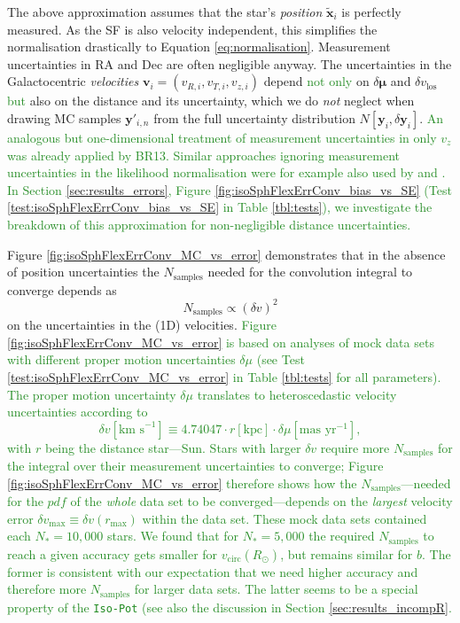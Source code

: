 \documentclass[iop,revtex4]{emulateapj}
\newcommand{\vect}[1]{\boldsymbol{#1}}
\newcommand{\pdf}{\ensuremath{pdf}}
\newcommand{\NEW}[1]{\textcolor{ForestGreen}{#1}}
\newcommand{\OLD}[1]{}
\begin{document}
The above approximation \OLD{also} assumes that the star's \emph{position} $\tilde{\vect{x}}_i$ is perfectly measured. As the SF is also velocity independent, this simplifies the normalisation drastically to Equation \eqref{eq:normalisation}. Measurement uncertainties in $\mathrm{RA}$ and $\mathrm{Dec}$ are often negligible anyway. The uncertainties in the Galactocentric \emph{velocities} $\vect{v}_i = (v_{R,i},v_{T,i},v_{z,i})$ depend \OLD{besides}\NEW{not only} on $\delta \vect{\mu}$ and $\delta v_\text{los}$ \NEW{but} also on the distance and its uncertainty, which we do \emph{not} neglect when drawing MC samples $\vect{y}'_{i,n}$ from the full uncertainty distribution $N[\vect{y}_i,\delta \vect{y}_i]$. \NEW{ An analogous but one-dimensional treatment of measurement uncertainties in only $v_z$ was already applied by BR13. Similar approaches ignoring measurement uncertainties in the likelihood normalisation were for example also used by \citet{2013MNRAS.433.1411M} and \citet{2016arXiv160309332D}. In Section \ref{sec:results_errors}, Figure \ref{fig:isoSphFlexErrConv_bias_vs_SE} (Test \ref{test:isoSphFlexErrConv_bias_vs_SE} in Table \ref{tbl:tests}), we investigate the breakdown of this approximation for non-negligible distance uncertainties.}

Figure \ref{fig:isoSphFlexErrConv_MC_vs_error} demonstrates that in the absence of position uncertainties the $N_\text{samples}$ needed for the convolution integral to converge depends as
\begin{equation*}
N_\text{samples} \propto \left( \delta v \right)^2
\end{equation*}
on the uncertainties in the (1D) velocities. 
\NEW{Figure \ref{fig:isoSphFlexErrConv_MC_vs_error} is based on analyses of mock data sets with different proper motion uncertainties $\delta \mu$ (see Test \ref{test:isoSphFlexErrConv_MC_vs_error} in Table \ref{tbl:tests} for all parameters). The proper motion uncertainty $\delta \mu$ translates to heteroscedastic velocity uncertainties according to 
\begin{equation*}
\delta v [\text{km s}^{-1}] \equiv 4.74047 \cdot r[\text{kpc}] \cdot \delta \mu [\text{mas yr}^{-1}],
\end{equation*}
with $r$ being the distance star---Sun. Stars with larger $\delta v$ require more $N_\text{samples}$ for the integral over their measurement uncertainties to converge; Figure  \ref{fig:isoSphFlexErrConv_MC_vs_error} therefore shows how the $N_\text{samples}$---needed for the \pdf{} of the \emph{whole} data set to be converged---depends on the \emph{largest} velocity error $\delta v_\text{max} \equiv \delta v(r_\text{max})$ within the data set.}
\NEW{These mock data sets contained each $N_{*}=10,000$ stars. We found that for $N_{*}=5,000$ the required $N_\text{samples}$ to reach a given accuracy gets smaller for $v_\text{circ}(R_\odot)$, but remains similar for $b$. The former is consistent with our expectation that  we need higher accuracy and therefore more $N_\text{samples}$ for larger data sets. The latter seems to be a special property of the \texttt{Iso-Pot} (see also the discussion in Section \ref{sec:results_incompR}.}
\end{document}
